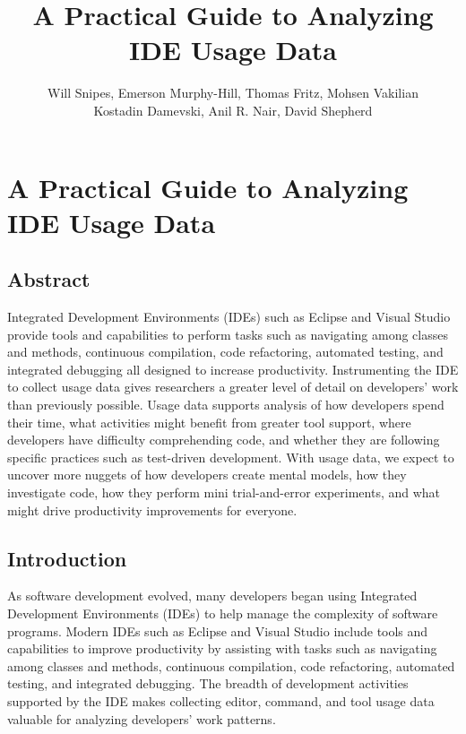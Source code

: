 \documentclass{book}
\begin{document}

\title{A Practical Guide to Analyzing IDE Usage Data\vspace{-0ex}}

\chapter{A Practical Guide to Analyzing IDE Usage Data\vspace{-0ex}}
\author{
Will Snipes, Emerson Murphy-Hill,
Thomas Fritz, Mohsen Vakilian \\
Kostadin Damevski,
Anil R. Nair, David Shepherd
}
\maketitle
\thispagestyle{empty}
\pagestyle{empty}

\begin{center}
\section*{Abstract}
\end{center}
Integrated Development Environments (IDEs) such as Eclipse and Visual Studio provide tools and capabilities to perform tasks such as navigating among classes and methods, continuous compilation, code refactoring, automated testing, and integrated debugging all designed to increase productivity.  Instrumenting the IDE to collect usage data gives researchers a greater level of detail on developers' work than previously possible.  Usage data supports analysis of how developers spend their time, what activities might benefit from greater tool support, where developers have difficulty comprehending code, and whether they are following specific practices such as test-driven development.  With usage data, we expect to uncover more nuggets of how developers create mental models, how they investigate code, how they perform mini trial-and-error experiments, and what might drive productivity improvements for everyone.

\section{Introduction}
As software development evolved, many developers began using Integrated Development Environments (IDEs) to help manage the complexity of software programs.  Modern IDEs such as Eclipse and Visual Studio include tools and capabilities to improve productivity by assisting with tasks such as navigating among classes and methods, continuous compilation, code refactoring, automated testing, and integrated debugging.  The breadth of development activities supported by the IDE makes collecting editor, command, and tool usage data valuable for analyzing developers' work patterns.  
\end{document}
